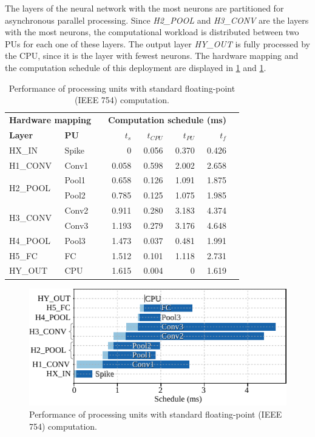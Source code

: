 The layers of the neural network with the most neurons are partitioned for asynchronous parallel processing. Since \emph{H2\_POOL} and \emph{H3\_CONV} are the layers with the most neurons, the computational workload is distributed between two PUs for each one of these layers. The output layer \emph{HY\_OUT} is fully processed by the CPU, since it is the layer with fewest neurons. The hardware mapping and the computation schedule of this deployment are displayed in \ref{tab:latency_fp} and \ref{fig:latency_pu_fp}.

\begin{table}[!t]\centering
	\caption{Performance of processing units with standard floating-point (IEEE 754) computation.}\label{tab:latency_fp}
	\scriptsize
	\begin{tabular}{llrrrrrr}\toprule
		\multicolumn{2}{c}{\textbf{Hardware mapping}} & &\multicolumn{4}{c}{\textbf{Computation schedule (ms)}} \\\cmidrule{1-2}\cmidrule{4-7}
		\textbf{Layer} &\textbf{PU} & &$t_s$ &$t_{CPU}$ &$t_{PU}$ &$t_f$ \\\midrule
		HX\_IN &Spike & &0 &0.056 &0.370 &0.426 \\
		H1\_CONV &Conv1 & &0.058 &0.598 &2.002 &2.658 \\
		\multirow{2}{*}{H2\_POOL}
		&Pool1 & &0.658 &0.126 &1.091 &1.875 \\
		&Pool2 & &0.785 &0.125 &1.075 &1.985 \\
		\multirow{2}{*}{H3\_CONV} 
		&Conv2 & &0.911 &0.280 &3.183 &4.374 \\
		&Conv3 & &1.193 &0.279 &3.176 &4.648 \\
		H4\_POOL &Pool3 & &1.473 &0.037 &0.481 &1.991 \\
		H5\_FC &FC & &1.512 &0.101 &1.118 &2.731 \\
		HY\_OUT &CPU & &1.615 &0.004 &0 &1.619 \\
		\bottomrule
	\end{tabular}
\end{table}

\begin{figure}[b!]
	\centering
	\includegraphics[width=0.5\columnwidth]{./chapters/sbs_accelerator/figures/latency_pu_fp.pdf}
	\caption{Performance of processing units with standard floating-point (IEEE 754) computation.}
	\label{fig:latency_pu_fp}
\end{figure}


